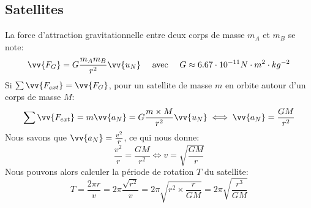 \documentclass[a5paper,10pt]{article}
\renewcommand*{\vec}{\vv}
\begin{document}
\subsection{Satellites}
La force d'attraction gravitationnelle entre deux corps de masse $m_A$ et $m_B$ se note:
$$\vec{F_G}=G\frac{m_Am_B}{r^2}\vec{u_N} \quad \text{ avec } \quad G\approx 6.67\cdot 10^{-11}N\cdot m^{2}\cdot kg^{-2}$$
Si $\sum{\vec{F_{ext}}}=\vec{F_G}$, pour un satellite de masse $m$ en orbite autour d'un corps de masse $M$:
$$\sum{\vec{F_{ext}}}=m\vec{a_N}=G\frac{m\times M}{r^2}\vec{u_N} \iff \vec{a_N}=\frac{GM}{r^2}$$
Nous savons que $\vec{a_N}=\frac{v^2}{r}$, ce qui nous donne:
$$\frac{v^2}{r}=\frac{GM}{r^2} \iff v=\sqrt{\frac{GM}{r}}$$
Nous pouvons alors calculer la période de rotation $T$ du satellite:
\begin{equation}\label{eq:1} T=\frac{2\pi r}{v}=2\pi\frac{\sqrt{r^2}}{v}=2\pi\sqrt{r^2\times\frac{r}{GM}}=2\pi\sqrt{\frac{r^3}{GM}}\end{equation}
\end{document}

